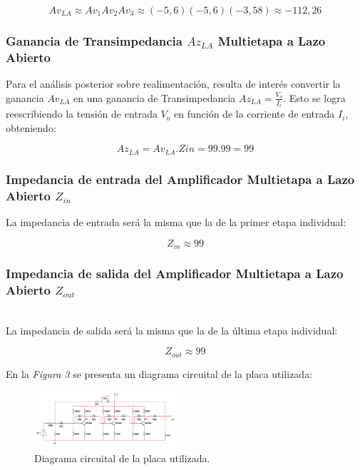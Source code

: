 \documentclass[letterpaper, 10 pt, conference]{ieeeconf}  %
\begin{document}
\begin{equation}
Av_{LA} \approx Av_1  Av_2  Av_3 \approx (-5,6)(-5,6)(-3,58) \approx -112,26
\end{equation}

\subsubsection{Ganancia de Transimpedancia $Az_{LA}$ Multietapa a Lazo Abierto}

Para el análisis posterior sobre realimentación, resulta de interés convertir la ganancia $Av_{LA}$ en una ganancia de Transimpedancia $Az_{LA} =\frac{V_o}{I_i}$. Esto se logra reescribiendo la tensión de entrada $V_o$ en función de la corriente de entrada $I_i$, obteniendo:

\begin{equation}
Az_{LA} = Av_{LA} . Z{in} = 99.99 = 99
\end{equation}

\subsubsection{Impedancia de entrada del Amplificador Multietapa a Lazo Abierto $Z_{in}$}

La impedancia de entrada será la misma que la de la primer etapa individual:

\begin{equation}
Z_{in} \approx 99
\end{equation}

\subsubsection{Impedancia de salida del Amplificador Multietapa a Lazo Abierto $Z_{out}$}\\

La impedancia de salida será la misma que la de la última etapa individual:

\begin{equation}
Z_{out} \approx 99
\end{equation}

En la \textit{Figura 3} se presenta un diagrama circuital de la placa utilizada:

\begin{figure}[H]
  \centering
  \includegraphics[width=0.47\textwidth]{imagenes/diagrama placa.png}
  \caption{Diagrama circuital de la placa utilizada.}
  \label{fig:diagramaplaca}
\end{figure}
\end{document}
